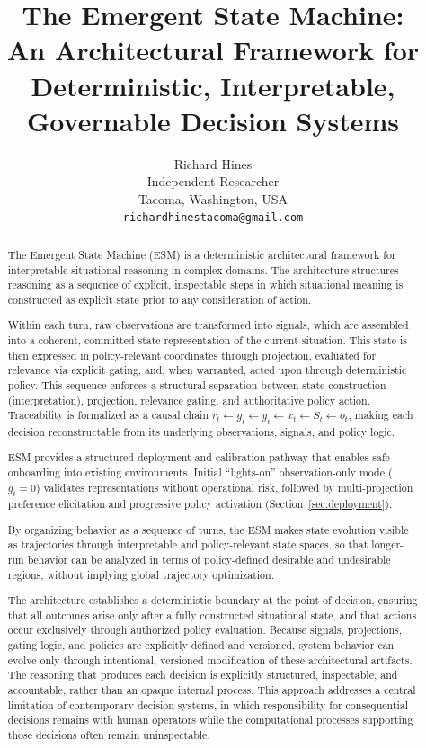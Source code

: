 \documentclass[11pt]{article}
\date{}
\title{The Emergent State Machine:\\
An Architectural Framework for\\
Deterministic, Interpretable, Governable Decision Systems}
\author{
Richard Hines\\
\small Independent Researcher\\
\small Tacoma, Washington, USA\\
\small \texttt{richardhinestacoma@gmail.com}\\
}
\begin{document}
\maketitle

\begin{abstract}

The Emergent State Machine (ESM) is a deterministic architectural framework for interpretable situational reasoning in complex domains. The architecture structures reasoning as a sequence of explicit, inspectable steps in which situational meaning is constructed as explicit state prior to any consideration of action.

Within each turn, raw observations are transformed into signals, which are assembled into a coherent, committed state representation of the current situation. This state is then expressed in policy-relevant coordinates through projection, evaluated for relevance via explicit gating, and, when warranted, acted upon through deterministic policy. This sequence enforces a structural separation between state construction (interpretation), projection, relevance gating, and authoritative policy action. Traceability is formalized as a causal chain 
$r_t \leftarrow g_t \leftarrow y_t \leftarrow x_t \leftarrow S_t \leftarrow o_t$,
making each decision reconstructable from its underlying observations, signals, and policy logic.

ESM provides a structured deployment and calibration pathway that enables safe onboarding into existing environments. Initial ``lights-on'' observation-only mode ($g_t=0$) validates representations without operational risk, followed by multi-projection preference elicitation and progressive policy activation (Section~\ref{sec:deployment}).

By organizing behavior as a sequence of turns, the ESM makes state evolution visible as trajectories through interpretable and policy-relevant state spaces, so that longer-run behavior can be analyzed in terms of policy-defined desirable and undesirable regions, without implying global trajectory optimization. 

The architecture establishes a deterministic boundary at the point of decision, ensuring that all outcomes arise only after a fully constructed situational state, and that actions occur exclusively through authorized policy evaluation. Because signals, projections, gating logic, and policies are explicitly defined and versioned, system behavior can evolve only through intentional, versioned modification of these architectural artifacts. The reasoning that produces each decision is explicitly structured, inspectable, and accountable, rather than an opaque internal process. This approach addresses a central limitation of contemporary decision systems, in which responsibility for consequential decisions remains with human operators while the computational processes supporting those decisions often remain uninspectable. 


\end{abstract}
\end{document}

